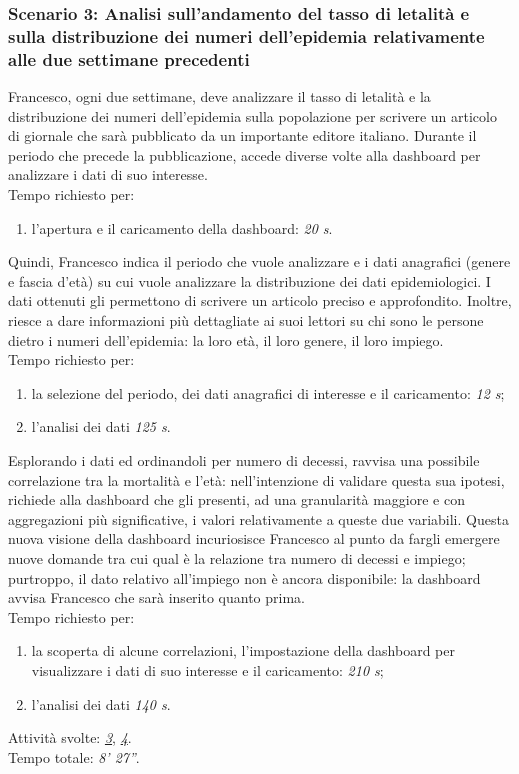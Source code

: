 \subsubsection{Scenario 3: Analisi sull'andamento del tasso di letalità e sulla distribuzione dei numeri dell'epidemia relativamente alle due settimane precedenti}
Francesco, ogni due settimane, deve analizzare il tasso di letalità e la distribuzione dei numeri dell’epidemia sulla popolazione per scrivere un articolo di giornale che sarà pubblicato da un importante editore italiano. Durante il periodo che precede la pubblicazione, accede diverse volte alla dashboard per analizzare i dati di suo interesse.\\
Tempo richiesto per:
\begin{enumerate}
    \item l'apertura e il caricamento della dashboard: \textit{20 s}.
\end{enumerate}

\noindent
Quindi, Francesco indica il periodo che vuole analizzare e i dati anagrafici (genere e fascia d'età) su cui vuole analizzare la distribuzione dei dati epidemiologici.
I dati ottenuti gli permettono di scrivere un articolo preciso e approfondito. Inoltre, riesce a dare informazioni più dettagliate ai suoi lettori su chi sono le persone dietro i numeri dell'epidemia: la loro età, il loro genere, il loro impiego.\\
Tempo richiesto per:
\begin{enumerate}
    \item la selezione del periodo, dei dati anagrafici di interesse e il caricamento: \textit{12 s};
    \item l'analisi dei dati \textit{125 s}.
\end{enumerate}

\noindent
Esplorando i dati ed ordinandoli per numero di decessi, ravvisa una possibile correlazione tra la mortalità e l'età: nell'intenzione di validare questa sua ipotesi, richiede alla dashboard che gli presenti, ad una granularità maggiore e con aggregazioni più significative, i valori relativamente a queste due variabili. 
Questa nuova visione della dashboard incuriosisce Francesco al punto da fargli emergere nuove domande tra cui qual è la relazione tra numero di decessi e impiego; purtroppo, il dato relativo all'impiego non è ancora disponibile: la dashboard avvisa Francesco che sarà inserito quanto prima.\\
Tempo richiesto per:
\begin{enumerate}
    \item la scoperta di alcune correlazioni, l'impostazione della dashboard per visualizzare i dati di suo interesse e il caricamento: \textit{210 s};
    \item l'analisi dei dati \textit{140 s}.
\end{enumerate}

\noindent
Attività svolte: \hyperref[itm:3]{\textit{3}}, \hyperref[itm:4]{\textit{4}}.\\ 
Tempo totale: \textit{8' 27''}.
